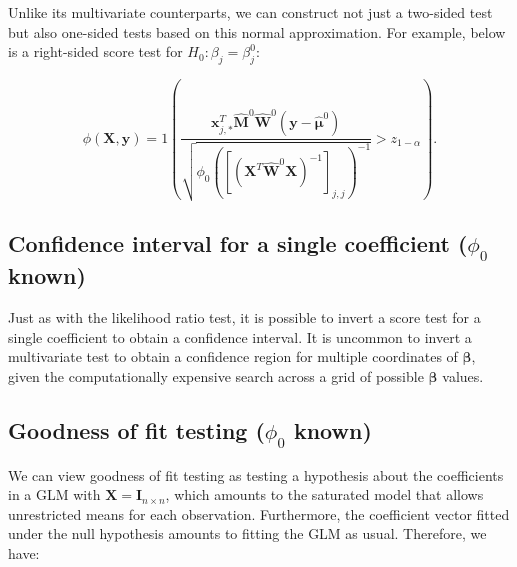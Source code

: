 \documentclass[
  11pt,
  letterpaper,
  oneside]{book}
\theoremstyle{plain}
\theoremstyle{plain}
\theoremstyle{definition}
\theoremstyle{definition}
\theoremstyle{plain}
\theoremstyle{remark}
\begin{document}
Unlike its multivariate counterparts, we can construct not just a
two-sided test but also one-sided tests based on this normal
approximation. For example, below is a right-sided score test for
\(H_0: \beta_j = \beta_j^0\):

\[
\phi(\boldsymbol{X}, \boldsymbol{y}) = 1\left(\frac{\boldsymbol{x}_{j,*}^T \boldsymbol{\widehat{M}}^0 \boldsymbol{\widehat{W}}^0 (\boldsymbol{y} - \boldsymbol{\widehat{\mu}}^0)}{\sqrt{\phi_0 ([(\boldsymbol{X}^T \boldsymbol{\widehat{W}}^0 \boldsymbol{X})^{-1}]_{j, j})^{-1}}} > z_{1-\alpha}\right).
\]

\hypertarget{sec-score-ci-single-coeff}{%
\subsection{\texorpdfstring{Confidence interval for a single coefficient
(\(\phi_0\)
known)}{Confidence interval for a single coefficient (\textbackslash phi\_0 known)}}\label{sec-score-ci-single-coeff}}

Just as with the likelihood ratio test, it is possible to invert a score
test for a single coefficient to obtain a confidence interval. It is
uncommon to invert a multivariate test to obtain a confidence region for
multiple coordinates of \(\boldsymbol{\beta}\), given the
computationally expensive search across a grid of possible
\(\boldsymbol{\beta}\) values.

\hypertarget{sec-score-goodness-of-fit}{%
\subsection{\texorpdfstring{Goodness of fit testing (\(\phi_0\)
known)}{Goodness of fit testing (\textbackslash phi\_0 known)}}\label{sec-score-goodness-of-fit}}

We can view goodness of fit testing as testing a hypothesis about the
coefficients in a GLM with
\(\boldsymbol{X} = \boldsymbol{I}_{n \times n}\), which amounts to the
saturated model that allows unrestricted means for each observation.
Furthermore, the coefficient vector fitted under the null hypothesis
amounts to fitting the GLM as usual. Therefore, we have:
\end{document}
